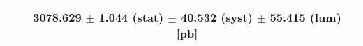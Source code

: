 \begin{tabular}{lc}
\hline
                               & 3078.629 $\pm$ 1.044 (stat) $\pm$ 40.532 (syst) $\pm$ 55.415 (lum) [pb]  \\
\hline
\end{tabular}

